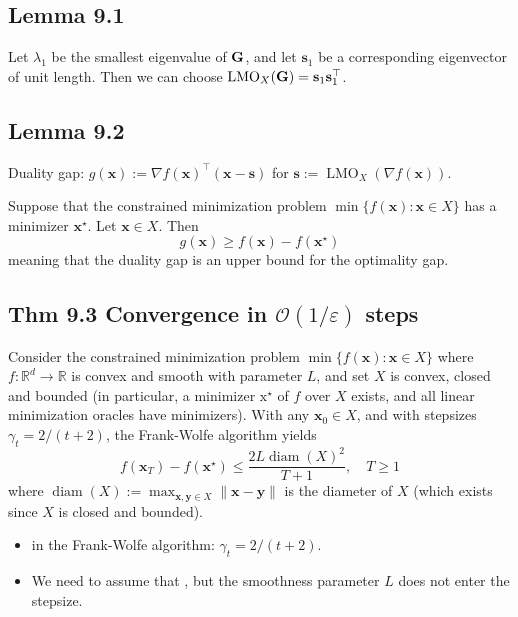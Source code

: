 \subsection*{Lemma 9.1}
Let $\lambda_{1}$ be the smallest eigenvalue of $\operatorname{\boldsymbol{\mathbf{G}}}$, and let $\mathbf{s}_{1}$ be a corresponding eigenvector of unit length. Then we can choose $\operatorname{LMO}_{X}(\operatorname{\boldsymbol{\mathbf{G}}})=\mathbf{s}_{1} \mathbf{s}_{1}^{\top}$.







\subsection*{Lemma 9.2}
Duality gap:
$
g(\mathbf{x}):=\nabla f(\mathbf{x})^{\top}(\mathbf{x}-\mathbf{s})$ for $ \mathbf{s}:=\operatorname{LMO}_{X}(\nabla f(\mathbf{x}))
$.

Suppose that the constrained minimization problem $\min \{f(\mathbf{x}): \mathbf{x} \in X\}$ has a minimizer $\mathbf{x}^{\star}$. Let $\mathbf{x} \in X$. Then
$$
g(\mathbf{x}) \geq f(\mathbf{x})-f\left(\mathbf{x}^{\star}\right)
$$
meaning that the duality gap is an upper bound for the optimality gap.






\subsection*{Thm 9.3 Convergence in $\mathcal{O}(1 / \varepsilon)$ steps}
Consider the constrained minimization problem $\min \{f(\mathbf{x}): \mathbf{x} \in X\}$ where $f: \mathbb{R}^{d} \rightarrow \mathbb{R}$ is convex and smooth with parameter $L$, and set $X$ is convex, closed and bounded (in particular, a minimizer $\mathrm{x}^{\star}$ of $f$ over $X$ exists, and all linear minimization oracles have minimizers). With any $\mathbf{x}_{0} \in X$, and with stepsizes $\gamma_{t}=2 /(t+2)$, the Frank-Wolfe algorithm yields
$$
f\left(\mathbf{x}_{T}\right)-f\left(\mathbf{x}^{\star}\right) \leq \frac{2 L \operatorname{diam}(X)^{2}}{T+1}, \quad T \geq 1
$$
where $\operatorname{diam}(X):=\max _{\mathbf{x}, \mathbf{y} \in X}\|\mathbf{x}-\mathbf{y}\|$ is the diameter of $X$ (which exists since $X$ is closed and bounded).

\begin{itemize}[leftmargin=*]
    \item {} in the Frank-Wolfe algorithm: $\gamma_{t}=2 /(t+2)$.
    \item We need to assume that , but the smoothness parameter $L$ does not enter the stepsize.
\end{itemize}





